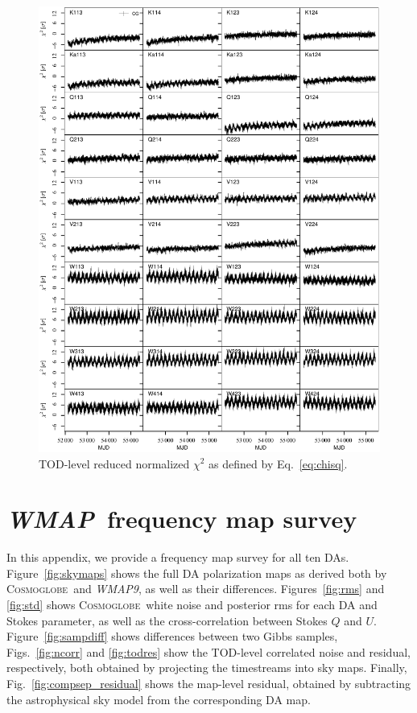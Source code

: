 \documentclass[twocolumn]{../../common/aa}
\def\WMAP{\emph{WMAP}}
\def\WMAPnine{\emph{WMAP9}}
\newcommand{\cosmoglobe}{\textsc{Cosmoglobe}}
\begin{document}
\begin{figure}[p]
	\centering
	\includegraphics[width=\textwidth]{figures/instpar_CG_chisq_v1.pdf}
	\caption{TOD-level reduced normalized $\chi^2$ as defined by Eq.~\eqref{eq:chisq}.}
	\label{fig:chisq}
\end{figure}

\clearpage
\section{\WMAP\ frequency map survey}
\label{sec:map_survey}

\noindent\begin{minipage}{\textwidth}
In this appendix, we provide a frequency map survey for all ten DAs. Figure~\ref{fig:skymaps} shows the full DA polarization maps as derived both by \cosmoglobe\ and \WMAPnine, as well as their differences. Figures~\ref{fig:rms} and \ref{fig:std} shows \cosmoglobe\ white noise and posterior rms for each DA and Stokes parameter, as well as the cross-correlation between Stokes $Q$ and $U$. Figure~\ref{fig:sampdiff} shows differences between two Gibbs samples, Figs.~\ref{fig:ncorr} and \ref{fig:todres} show the TOD-level correlated noise and residual, respectively, both obtained by projecting the timestreams into sky maps. Finally, Fig.~\ref{fig:compsep_residual} shows the map-level residual, obtained by subtracting the astrophysical sky model from the corresponding DA map.
\end{minipage}
\end{document}
